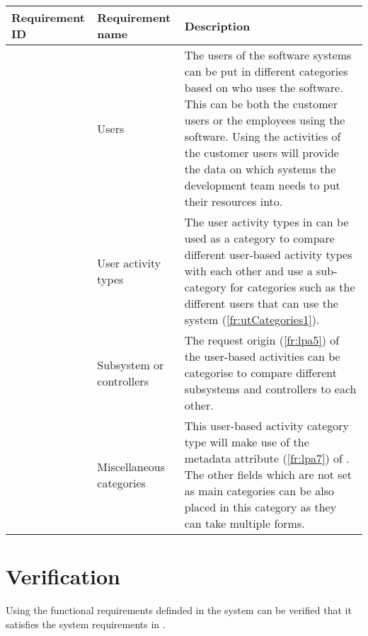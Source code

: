 \begin{table}[!htb]
	\centering
	\caption[System utilisation analysis categories]
	{\textit{System utilisation analysis categories}}
	\label{tbl:ch2_utilisationCategories}
	\begin{xltabular}{\textwidth}{|l|l|X|}
		\hline \textbf{Requirement ID} & \textbf{Requirement name} & \textbf{Description} \\
		\hline {} & Users & The users of the software systems can be put in different categories based on who uses the software. This can be both the customer users or the employees using the software. Using the activities of the customer users will provide the data on which systems the development team needs to put their resources into. \\
		\hline {} & User activity types & The user activity types in  can be used as a category to compare different user-based activity types with each other and use a sub-category for categories such as the different users that can use the system (\ref{fr:utCategories1}). \\
		\hline {} & Subsystem or controllers & The request origin (\ref{fr:lpa5}) of the user-based activities can be categorise to compare different subsystems and controllers to each other.\\
		\hline {} & Miscellaneous categories & This user-based activity category type will make use of the metadata attribute (\ref{fr:lpa7}) of . The other fields which are not set as main categories can be also placed in this category as they can take multiple forms.\\
		\hline
	\end{xltabular}
\end{table}

\clearpage

\section{Verification}\label{sec:ch2_verification}
Using the functional requirements definded in  the system can be verified that it satisfies the system requirements in .

